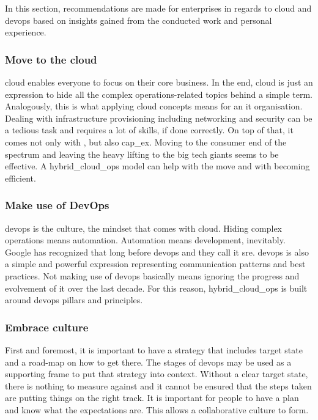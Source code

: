 \documentclass[../main.tex]{subfiles}
\begin{document}
    In this section, recommendations are made for enterprises in regards to \gls{cloud} and \gls{devops} based on insights gained from the conducted work and personal experience.

    \subsubsection{Move to the cloud}

    \Gls{cloud} enables everyone to focus on their core business.
    In the end, \gls{cloud} is just an expression to hide all the complex operations-related topics behind a simple term.
    Analogously, this is what applying \gls{cloud} concepts means for an \acrshort{it} organisation.
    Dealing with infrastructure provisioning including networking and security can be a tedious task and requires a lot of skills, if done correctly.
    On top of that, it comes not only with , but also \gls{cap_ex}.
    Moving to the consumer end of the spectrum and leaving the heavy lifting to the big tech giants seems to be effective.
    A \gls{hybrid_cloud_ops} model can help with the move and with becoming efficient.

    \subsubsection{Make use of DevOps}

    \gls{devops} is the culture, the mindset that comes with cloud.
    Hiding complex operations means automation.
    Automation means development, inevitably.
    Google has recognized that long before \gls{devops} and they call it \acrlong{sre}.
    \gls{devops} is also a simple and powerful expression representing communication patterns and best practices.
    Not making use of \gls{devops} basically means ignoring the progress and evolvement of \acrshort{it} over the last decade.
    For this reason, \gls{hybrid_cloud_ops} is built around \gls{devops} pillars and principles.

    \subsubsection{Embrace culture}

    First and foremost, it is important to have a strategy that includes target state and a road-map on how to get there.
    The stages of \gls{devops} may be used as a supporting frame to put that strategy into context.
    Without a clear target state, there is nothing to measure against and it cannot be ensured that the steps taken are putting things on the right track.
    It is important for people to have a plan and know what the expectations are.
    This allows a collaborative culture to form.
\end{document}
